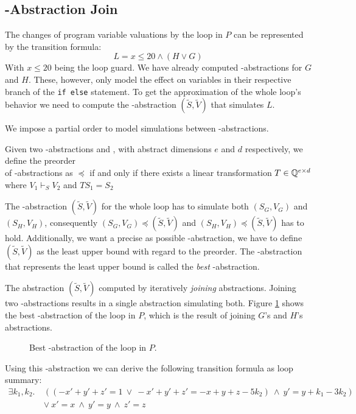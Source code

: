 \subsection{\qvasr-Abstraction Join}
The changes of program variable valuations by the loop in $P$ can be represented by the transition formula: 
\begin{equation*}
	L = x \leq 20 \land (H \lor G)
\end{equation*}
With $x \leq 20$ being the loop guard. We have already computed \qvasr-abstractions for $G$ and $H$. These, however, only model the effect on variables in their respective branch of the \texttt{if else} statement. To get the approximation of the whole loop's behavior we need to compute the \qvasr-abstraction $(\tilde{S}, \tilde{V})$ that simulates $L$. \\ \par We impose a partial order to model simulations between \qvasr-abstractions.
\begin{mydef}
	Given two \qvasr-abstractions   and , with abstract dimensions $e$ and $d$ respectively, we define the preorder \\ of \qvasr-abstractions as  $\preceq$  if and only if there exists a linear transformation $T \in  \mathbb{Q} ^{e \times d}$ where $V_1 \vdash_S V_2$ and $TS_1 = S_2$
\end{mydef}
The \qvasr-abstraction $(\tilde{S}, \tilde{V})$ for the whole loop has to simulate both $(S_G, V_G)$ and $(S_H, V_H)$, consequently $(S_G, V_G) \preceq (\tilde{S}, \tilde{V})$ and $(S_H, V_H) \preceq (\tilde{S}, \tilde{V})$ has to hold. Additionally, we want a precise as possible \qvasr-abstraction, we have to define $(\tilde{S}, \tilde{V})$ as the least upper bound with regard to the preorder. The \qvasr-abstraction that represents the least upper bound is called the \textsl{best} \qvasr-abstraction. \\ \par

The abstraction $(\tilde{S}, \tilde{V})$ computed by iteratively \textsl{joining} abstractions. Joining two \qvasr-abstractions results in a single abstraction simulating both. Figure \ref{vasr} shows the best \qvasr-abstraction of the loop in $P$, which is the result of joining $G$'s and $H$'s abstractions. \\
\begin{center}
	\begin{figure}[H]
		
		\caption{Best \qvasr-abstraction of the loop in $P$.}
		\label{vasr}
	\end{figure}
\end{center}
Using this \qvasr-abstraction we can derive the following transition formula as loop summary:
\begin{align*}
	\exists k_1, k_2.\ &((-x' + y' + z' = 1\ \lor\ -x' + y' + z' = -x + y + z - 5k_2)\ \land\ y' = y + k_1 - 3k_2)\ \\ &\lor\ x' = x\ \land\ y' = y\ \land\ z' = z
\end{align*}
